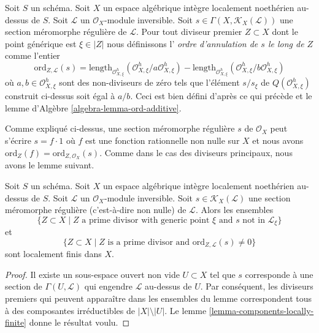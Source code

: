 \begin{definition}
\label{definition-order-vanishing-meromorphic}
Soit $S$ un schéma. Soit $X$ un espace algébrique intègre localement noethérien
au-dessus de $S$. Soit $\mathcal{L}$ un
$\mathcal{O}_X$-module inversible.
Soit $s \in \Gamma(X, \mathcal{K}_X(\mathcal{L}))$
une section méromorphe régulière de $\mathcal{L}$.
Pour tout diviseur premier $Z \subset X$ dont le point générique est $\xi \in |Z|$
nous définissons l'
{\it ordre d'annulation de $s$ le long de $Z$}
comme l'entier
$$
\text{ord}_{Z, \mathcal{L}}(s) =
\text{length}_{\mathcal{O}_{X, \xi}^h}
(\mathcal{O}_{X, \xi}^h/a \mathcal{O}_{X, \xi}^h) -
\text{length}_{\mathcal{O}_{X, \xi}^h}
(\mathcal{O}_{X, \xi}^h/b \mathcal{O}_{X, \xi}^h)
$$
où $a, b \in \mathcal{O}_{X, \xi}^h$ sont des non-diviseurs de zéro
tels que l'élément $s/s_\xi$ de $Q(\mathcal{O}_{X, \xi}^h)$
construit ci-dessus soit égal à $a/b$.
Ceci est bien défini d'après ce qui précède et
le lemme d'Algèbre \ref{algebra-lemma-ord-additive}.
\end{definition}

\noindent
Comme expliqué ci-dessus, une section méromorphe régulière $s$ de $\mathcal{O}_X$
peut s'écrire $s = f \cdot 1$ où $f$
est une fonction rationnelle non nulle sur $X$ et nous avons
$\text{ord}_Z(f) = \text{ord}_{Z, \mathcal{O}_X}(s)$.
Comme dans le cas des diviseurs principaux, nous avons le lemme suivant.

\begin{lemma}
\label{lemma-divisor-meromorphic-locally-finite}
Soit $S$ un schéma. Soit $X$ un espace algébrique intègre localement noethérien
au-dessus de $S$. Soit $\mathcal{L}$ un $\mathcal{O}_X$-module inversible.
Soit $s \in \mathcal{K}_X(\mathcal{L})$ une
section méromorphe régulière (c'est-à-dire non nulle) de $\mathcal{L}$. Alors les ensembles
$$
\{Z \subset X \mid Z \text{ a prime divisor with generic point }\xi
\text{ and }s\text{ not in }\mathcal{L}_\xi\}
$$
et
$$
\{Z \subset X \mid Z \text{ is a prime divisor and }
\text{ord}_{Z, \mathcal{L}}(s) \not = 0\}
$$
sont localement finis dans $X$.
\end{lemma}

\begin{proof}
Il existe un sous-espace ouvert non vide $U \subset X$ tel que $s$
corresponde à une section de $\Gamma(U, \mathcal{L})$ qui engendre
$\mathcal{L}$ au-dessus de $U$. Par conséquent, les diviseurs premiers qui peuvent apparaître
dans les ensembles du lemme correspondent tous à des composantes irréductibles de
$|X| \setminus |U|$. Le lemme \ref{lemma-components-locally-finite}
donne le résultat voulu.
\end{proof}

